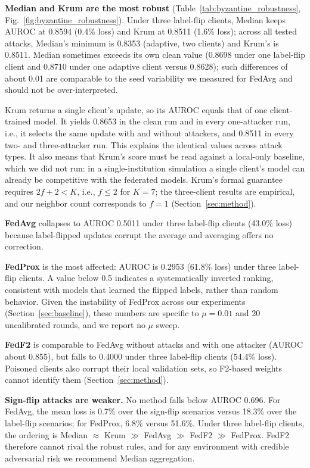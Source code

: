 \documentclass[journal]{IEEEtran}
\begin{document}
\textbf{Median and Krum are the most robust} (Table~\ref{tab:byzantine_robustness}, Fig.~\ref{fig:byzantine_robustness}). Under three label-flip clients, Median keeps AUROC at 0.8594 (0.4\% loss) and Krum at 0.8511 (1.6\% loss); across all tested attacks, Median's minimum is 0.8353 (adaptive, two clients) and Krum's is 0.8511. Median sometimes exceeds its own clean value (0.8698 under one label-flip client and 0.8710 under one adaptive client versus 0.8628); such differences of about 0.01 are comparable to the seed variability we measured for FedAvg and should not be over-interpreted.

Krum returns a single client's update, so its AUROC equals that of one client-trained model. It yields 0.8653 in the clean run and in every one-attacker run, i.e., it selects the same update with and without attackers, and 0.8511 in every two- and three-attacker run. This explains the identical values across attack types. It also means that Krum's score must be read against a local-only baseline, which we did not run: in a single-institution simulation a single client's model can already be competitive with the federated models. Krum's formal guarantee requires $2f+2<K$, i.e., $f\le 2$ for $K=7$; the three-client results are empirical, and our neighbor count corresponds to $f=1$ (Section~\ref{sec:method}).

\textbf{FedAvg} collapses to AUROC 0.5011 under three label-flip clients (43.0\% loss) because label-flipped updates corrupt the average and averaging offers no correction.

\textbf{FedProx} is the most affected: AUROC is 0.2953 (61.8\% loss) under three label-flip clients. A value below 0.5 indicates a systematically inverted ranking, consistent with models that learned the flipped labels, rather than random behavior. Given the instability of FedProx across our experiments (Section~\ref{sec:baseline}), these numbers are specific to $\mu=0.01$ and 20 uncalibrated rounds, and we report no $\mu$ sweep.

\textbf{FedF2} is comparable to FedAvg without attacks and with one attacker (AUROC about 0.855), but falls to 0.4000 under three label-flip clients (54.4\% loss). Poisoned clients also corrupt their local validation sets, so F2-based weights cannot identify them (Section~\ref{sec:method}).

\textbf{Sign-flip attacks are weaker.} No method falls below AUROC 0.696. For FedAvg, the mean loss is 0.7\% over the sign-flip scenarios versus 18.3\% over the label-flip scenarios; for FedProx, 6.8\% versus 51.6\%. Under three label-flip clients, the ordering is Median $\approx$ Krum $\gg$ FedAvg $\gg$ FedF2 $\gg$ FedProx. FedF2 therefore cannot rival the robust rules, and for any environment with credible adversarial risk we recommend Median aggregation.
\end{document}
